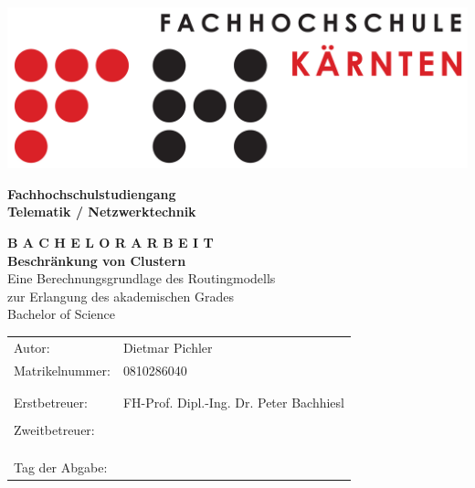 \begin{titlepage}
\hspace{8cm}
\begin{minipage}[b]{1cm}
\begin{center}
\includegraphics [scale=0.3]{pics/fhlogo0.png}
\end{center}
\end{minipage}
\hspace{-10cm}
\textbf{Fachhochschulstudiengang\\
Telematik / Netzwerktechnik}
\vspace{2cm}
\begin{center}
{\huge \bfseries B A C H E L O R A R B E I T}\\
\vspace{3.2cm}
\Large{\textbf{Beschr\"ankung von Clustern}}\\
\Large{Eine Berechnungsgrundlage des Routingmodells}\\
\vspace{2.4cm} \normalsize zur Erlangung des akademischen Grades\\
Bachelor of Science
\end{center}
\vspace{1.5cm}
%
%
\begin{tabular}{l l}
Autor: & Dietmar Pichler\\
Matrikelnummer: & 0810286040\\
& \\
& \\
Erstbetreuer: & FH-Prof. Dipl.-Ing. Dr. Peter Bachhiesl\\
& \\
Zweitbetreuer: & \\
& \\
& \\
& \\
Tag der Abgabe: & \\
%
%
\end{tabular}
\end{titlepage}
